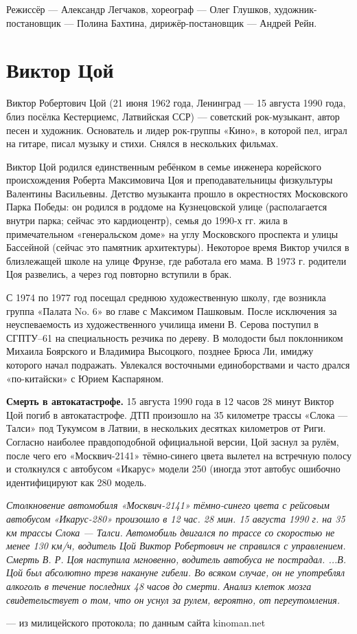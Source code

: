 Режиссёр --- Александр Легчаков, хореограф --- Олег Глушков, художник-постановщик --- Полина Бахтина, дирижёр-постановщик --- Андрей Рейн.


\section{Виктор Цой}
Виктор Робертович Цой (21 июня 1962 года, Ленинград --- 15 августа 1990 года, близ посёлка Кестерциемс, Латвийская ССР) --- советский рок-музыкант, автор песен и художник. Основатель и лидер рок-группы «Кино», в которой пел, играл на гитаре, писал музыку и стихи. Снялся в нескольких фильмах.

Виктор Цой родился единственным ребёнком в семье инженера корейского происхождения Роберта Максимовича Цоя и преподавательницы физкультуры Валентины Васильевны. Детство музыканта прошло в окрестностях Московского Парка Победы: он родился в роддоме на Кузнецовской улице (располагается внутри парка; сейчас это кардиоцентр), семья до 1990-х гг. жила в примечательном «генеральском доме» на углу Московского проспекта и улицы Бассейной (сейчас это памятник архитектуры). Некоторое время Виктор учился в близлежащей школе на улице Фрунзе, где работала его мама. В 1973 г. родители Цоя развелись, а через год повторно вступили в брак.

С 1974 по 1977 год посещал среднюю художественную школу, где возникла группа «Палата No. 6» во главе с Максимом Пашковым.
После исключения за неуспеваемость из художественного училища имени В. Серова поступил в СГПТУ--61 на специальность резчика по дереву.
В молодости был поклонником Михаила Боярского и Владимира Высоцкого, позднее Брюса Ли, имиджу которого начал подражать.
Увлекался восточными единоборствами и часто дрался «по-китайски» с Юрием Каспаряном.

\textbf{Смерть в автокатастрофе.}
15 августа 1990 года в 12 часов 28 минут Виктор Цой погиб в автокатастрофе. ДТП произошло на 35 километре трассы «Слока --- Талси» под Тукумсом в Латвии, в нескольких десятках километров от Риги. Согласно наиболее правдоподобной официальной версии, Цой заснул за рулём, после чего его «Москвич-2141» тёмно-синего цвета вылетел на встречную полосу и столкнулся с автобусом «Икарус» модели 250 (иногда этот автобус ошибочно идентифицируют как 280 модель.

{\it Столкновение автомобиля «Москвич-2141» тёмно-синего цвета с рейсовым автобусом «Икарус-280» произошло в 12 час. 28 мин. 15 августа 1990 г. на 35 км трассы Слока --- Талси. Автомобиль двигался по трассе со скоростью не менее 130 км/ч, водитель Цой Виктор Робертович не справился с управлением. Смерть В. Р. Цоя наступила мгновенно, водитель автобуса не пострадал. ...В. Цой был абсолютно трезв накануне гибели. Во всяком случае, он не употреблял алкоголь в течение последних 48 часов до смерти. Анализ клеток мозга свидетельствует о том, что он уснул за рулем, вероятно, от переутомления.

--- из милицейского протокола; по данным сайта kinoman.net}

